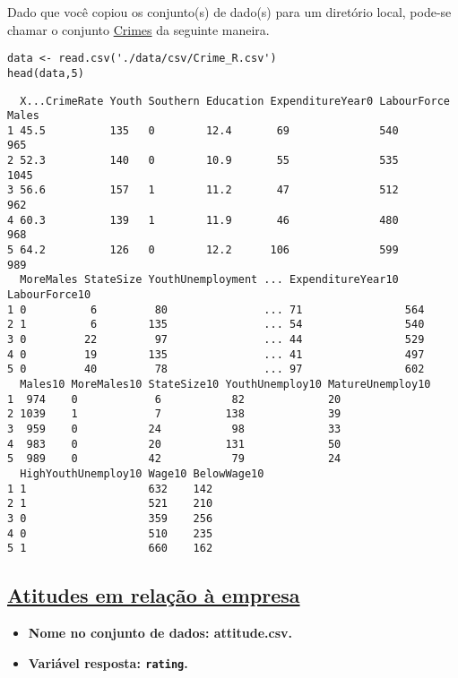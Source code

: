 \documentclass[11pt]{article}
\begin{document}
Dado que você copiou os conjunto(s) de dado(s) para um diretório
local, pode-se chamar o conjunto \href{https://drive.google.com/file/d/1hZpHoEXbhZGvmtmrbcWpXYfBV-2ZD7uF/view?usp=sharing}{Crimes} da seguinte maneira.

\begin{verbatim}
data <- read.csv('./data/csv/Crime_R.csv')
head(data,5)
\end{verbatim}

\begin{verbatim}
  X...CrimeRate Youth Southern Education ExpenditureYear0 LabourForce Males
1 45.5          135   0        12.4       69              540          965 
2 52.3          140   0        10.9       55              535         1045 
3 56.6          157   1        11.2       47              512          962 
4 60.3          139   1        11.9       46              480          968 
5 64.2          126   0        12.2      106              599          989 
  MoreMales StateSize YouthUnemployment ... ExpenditureYear10 LabourForce10
1 0          6         80               ... 71                564          
2 1          6        135               ... 54                540          
3 0         22         97               ... 44                529          
4 0         19        135               ... 41                497          
5 0         40         78               ... 97                602          
  Males10 MoreMales10 StateSize10 YouthUnemploy10 MatureUnemploy10
1  974    0            6           82             20              
2 1039    1            7          138             39              
3  959    0           24           98             33              
4  983    0           20          131             50              
5  989    0           42           79             24              
  HighYouthUnemploy10 Wage10 BelowWage10
1 1                   632    142        
2 1                   521    210        
3 0                   359    256        
4 0                   510    235        
5 1                   660    162        
\end{verbatim}
\clearpage

\subsection{\href{https://r-data.pmagunia.com/dataset/r-dataset-package-datasets-attitude}{Atitudes em relação à empresa}}
\label{sec:org59f688f}
\begin{itemize}
\item \textbf{Nome no conjunto de dados: \textbf{attitude.csv}.}
\item \textbf{Variável resposta: \texttt{rating}.}
\end{itemize}
\end{document}
